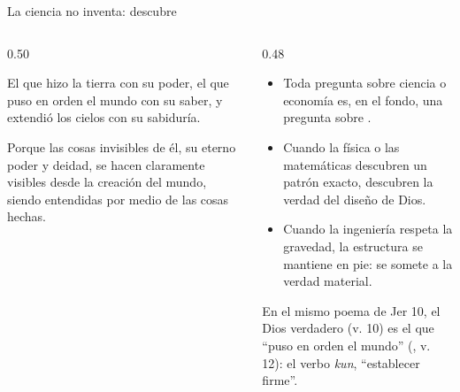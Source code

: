 \begin{frame}{La ciencia no inventa: descubre}
\begin{columns}[c,onlytextwidth]
\begin{column}{0.50\textwidth}
\begin{cita}El que hizo la tierra con su poder, el que puso en orden el mundo con su saber, y extendió los cielos con su sabiduría.\end{cita}
\begin{cita}Porque las cosas invisibles de él, su eterno poder y deidad, se hacen claramente visibles desde la creación del mundo, siendo entendidas por medio de las cosas hechas.\end{cita}
\end{column}
\begin{column}{0.48\textwidth}\small
\begin{itemize}
\item Toda pregunta sobre ciencia o economía es, en el fondo, una pregunta sobre .
\item Cuando la física o las matemáticas descubren un patrón exacto, descubren la verdad del diseño de Dios.
\item Cuando la ingeniería respeta la gravedad, la estructura se mantiene en pie: se somete a la verdad material.
\end{itemize}
\scriptsize En el mismo poema de Jer 10, el Dios verdadero (v. 10) es el que ``puso en orden el mundo'' (, v. 12): el verbo \emph{kun}, ``establecer firme''.
\end{column}
\end{columns}
\end{frame}

